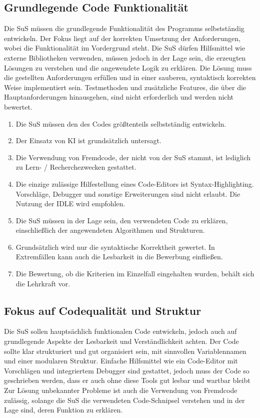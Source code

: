 \documentclass[a4paper,12pt]{article}
\begin{document}
\subsection{Grundlegende Code Funktionalität}
Die SuS müssen die grundlegende Funktionalität des Programms selbstständig entwickeln. Der Fokus liegt auf der korrekten Umsetzung der Anforderungen, wobei die Funktionalität im Vordergrund steht. Die SuS dürfen Hilfsmittel wie externe Bibliotheken verwenden, müssen jedoch in der Lage sein, die erzeugten Lösungen zu verstehen und die angewendete Logik zu erklären. Die Lösung muss die gestellten Anforderungen erfüllen und in einer sauberen, syntaktisch korrekten Weise implementiert sein. Testmethoden und zusätzliche Features, die über die Hauptanforderungen hinausgehen, sind nicht erforderlich und werden nicht bewertet.

\begin{enumerate}[label=\S\ \arabic*]
    \item Die SuS müssen den des Codes größtenteils selbstständig entwickeln.
    \item Der Einsatz von KI ist grundsätzlich untersagt.
    \item Die Verwendung von Fremdcode, der nicht von der SuS stammt, ist lediglich zu Lern- / Recherchezwecken gestattet.
    \item Die einzige zulässige Hilfestellung eines Code-Editors ist Syntax-Highlighting. Vorschläge, Debugger und sonstige Erweiterungen sind nicht erlaubt. Die Nutzung der IDLE wird empfohlen.
    \item Die SuS müssen in der Lage sein, den verwendeten Code zu erklären, einschließlich der angewendeten Algorithmen und Strukturen.
    \item Grundsätzlich wird nur die syntaktische Korrektheit gewertet. In Extremfällen kann auch die Lesbarkeit in die Bewerbung einfließen.
    \item Die Bewertung, ob die Kriterien im Einzelfall eingehalten wurden, behält sich die Lehrkraft vor.
\end{enumerate}


\subsection{Fokus auf Codequalität und Struktur}
Die SuS sollen hauptsächlich funktionalen Code entwickeln, jedoch auch auf grundlegende Aspekte der Lesbarkeit und Verständlichkeit achten. Der Code sollte klar strukturiert und gut organisiert sein, mit sinnvollen Variablennamen und einer modularen Struktur. Einfache Hilfsmittel wie ein Code-Editor mit Vorschlägen und integriertem Debugger sind gestattet, jedoch muss der Code so geschrieben werden, dass er auch ohne diese Tools gut lesbar und wartbar bleibt Zur Lösung unbekannter Probleme ist auch die Verwendung von Fremdcode zulässig, solange die SuS die verwendeten Code-Schnipsel verstehen und in der Lage sind, deren Funktion zu erklären.
\end{document}
